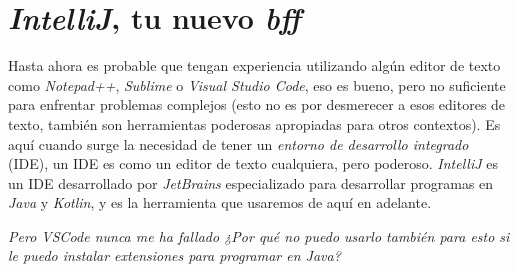    \chapter{\textit{IntelliJ}, tu nuevo \textit{bff}}
      Hasta ahora es probable que tengan experiencia utilizando algún editor de texto como 
      \textit{Notepad++}, \textit{Sublime} o \textit{Visual Studio Code}, eso es bueno, pero no 
      suficiente para enfrentar problemas complejos (esto no es por desmerecer a esos editores de 
      texto, también son herramientas poderosas apropiadas para otros contextos).
      Es aquí cuando surge la necesidad de tener un \textit{entorno de desarrollo integrado} (IDE),
      un IDE es como un editor de texto cualquiera, pero poderoso.
      \textit{IntelliJ} es un IDE desarrollado por \textit{JetBrains} especializado para desarrollar
      programas en \textit{Java} y \textit{Kotlin}, y es la herramienta que usaremos de aquí en
      adelante.
      \begin{center}
        \textit{
          Pero VSCode nunca me ha fallado ¿Por qué no puedo usarlo también para esto si le puedo 
          instalar extensiones para programar en Java?
        }
      \end{center}

  \nocite{*}
